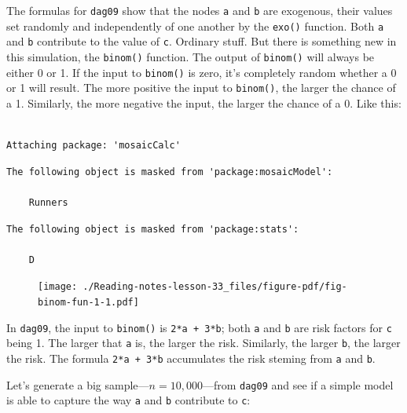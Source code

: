 \documentclass[
  letterpaper,
  DIV=11,
  numbers=noendperiod,
  oneside]{scrreprt}
\begin{document}
{\begin{footnotesize}
The formulas for \texttt{dag09} show that the nodes \texttt{a} and
\texttt{b} are exogenous, their values set randomly and independently of
one another by the \texttt{exo()} function. Both \texttt{a} and
\texttt{b} contribute to the value of \texttt{c}. Ordinary stuff. But
there is something new in this simulation, the \texttt{binom()}
function. The output of \texttt{binom()} will always be either 0 or 1.
If the input to \texttt{binom()} is zero, it's completely random whether
a 0 or 1 will result. The more positive the input to \texttt{binom()},
the larger the chance of a 1. Similarly, the more negative the input,
the larger the chance of a 0. Like this:

\begin{verbatim}

Attaching package: 'mosaicCalc'
\end{verbatim}

\begin{verbatim}
The following object is masked from 'package:mosaicModel':

    Runners
\end{verbatim}

\begin{verbatim}
The following object is masked from 'package:stats':

    D
\end{verbatim}

\begin{figure}


{\centering \texttt{[image: ./Reading-notes-lesson-33\_files/figure-pdf/fig-binom-fun-1-1.pdf]}

}

\end{figure}

In \texttt{dag09}, the input to \texttt{binom()} is
\texttt{2*a\ +\ 3*b}; both \texttt{a} and \texttt{b} are risk factors
for \texttt{c} being 1. The larger that \texttt{a} is, the larger the
risk. Similarly, the larger \texttt{b}, the larger the risk. The formula
\texttt{2*a\ +\ 3*b} accumulates the risk steming from \texttt{a} and
\texttt{b}.

Let's generate a big sample---\(n=10,000\)---from \texttt{dag09} and see
if a simple model is able to capture the way \texttt{a} and \texttt{b}
contribute to \texttt{c}:


\end{footnotesize}}
\end{document}
